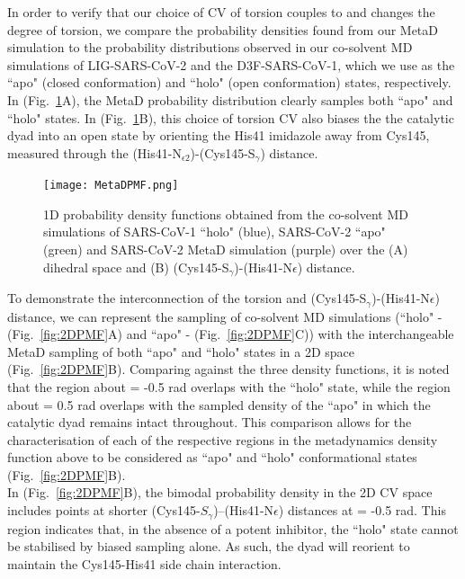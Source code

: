 In order to verify that our choice of CV of \dihone torsion couples to and changes the degree of \dihtwo torsion, we compare the probability densities found from our MetaD simulation to the probability distributions observed in our co-solvent MD simulations of LIG-SARS-CoV-2 and the D3F-SARS-CoV-1, which we use as the ``apo" (closed conformation) and ``holo" (open conformation) states, respectively. In (Fig.~\ref{fig:1Dim_PDF}A), the MetaD probability distribution clearly samples both ``apo" and ``holo" states. In (Fig.~\ref{fig:1Dim_PDF}B), this choice of \dihone torsion CV also biases the the catalytic dyad into an open state by orienting the His41 imidazole away from Cys145, measured through the (His41-N$_{\epsilon2}$)-(Cys145-S$_{\gamma}$) distance.\\

\begin{figure}
    \centering
    \texttt{[image: MetaDPMF.png]}
    \caption{1D probability density functions obtained from the co-solvent MD simulations of SARS-CoV-1 ``holo" (blue), SARS-CoV-2 ``apo" (green) and SARS-CoV-2 MetaD simulation (purple) over the (A) \dihtwo dihedral space and (B) (Cys145-S$_{\gamma}$)-(His41-N{$\epsilon$}) distance.} 
    \label{fig:1Dim_PDF}
\end{figure}

To demonstrate the interconnection of the \dihtwo torsion and (Cys145-S$_{\gamma}$)-(His41-N{$\epsilon$}) distance, we can represent the sampling of co-solvent MD simulations (``holo" - (Fig.~\ref{fig:2DPMF}A) and ``apo" - (Fig.~\ref{fig:2DPMF}C)) with the interchangeable MetaD sampling of both ``apo" and ``holo" states in a 2D space (Fig.~\ref{fig:2DPMF}B).  Comparing against the three density functions, it is noted that the region about \dihtwo = -0.5 rad overlaps with the ``holo" state, while the region about \dihtwo = 0.5 rad overlaps with the sampled density of the ``apo" in which the catalytic dyad remains intact throughout. This comparison allows for the characterisation of each of the respective regions in the metadynamics density function above to be considered as ``apo" and ``holo" conformational states (Fig.~\ref{fig:2DPMF}B).\\

In (Fig.~\ref{fig:2DPMF}B), the bimodal probability density in the 2D CV space includes points at shorter (Cys145-$S_{\gamma}$)--(His41-N{$\epsilon$}) distances at \dihtwo = -0.5 rad. This region indicates that, in the absence of a potent inhibitor, the ``holo" state cannot be stabilised by biased \dihone sampling alone. As such, the dyad will reorient to maintain the Cys145-His41 side chain interaction.\\


